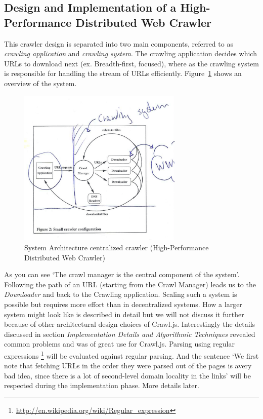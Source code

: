 \subsection{Design and Implementation of a High-Performance Distributed Web Crawler~\cite{hp_crawler}}
This crawler design is separated into two main components, referred to as \emph{crawling application} and \emph{crawling system}. The crawling application decides which URLs to download next (ex. Breadth-first, focused), where as the crawling system is responsible for handling the stream of URLs efficiently. Figure~\ref{hp_crawler} shows an overview of the system.
\begin{figure}[h]
\centering
  \includegraphics[width=0.7\textwidth]{Figures/hp_crawler.jpg}
\caption{System Architecture centralized crawler (High-Performance Distributed Web Crawler)}
\label{hp_crawler}
\end{figure}
As you can see `The crawl manager is the central component of the system'. Following the path of an URL (starting from the Crawl Manager) leads us to the \emph{Downloader} and back to the Crawling application. Scaling such a system is possible but requires more effort than in decentralized systems. How a larger system might look like is described in detail but we will not discuss it further because of other architectural design choices of Crawl.js.
Interestingly the details discussed in section \emph{Implementation Details and Algorithmic Techniques} revealed common problems and was of great use for Crawl.js. Parsing using regular expressions \footnote{\url{http://en.wikipedia.org/wiki/Regular_expression}} will be evaluated against regular parsing. And the sentence `We first note that fetching URLs in the order they were parsed out of the pages is avery bad idea, since there is a lot of second-level domain locality in the links' will be respected during the implementation phase. More details later. 

